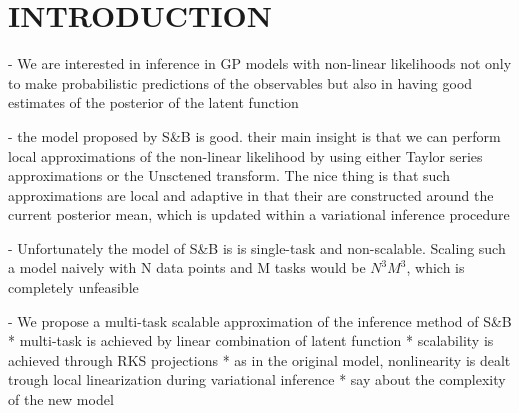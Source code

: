 \section{INTRODUCTION}
% 
\citet{steinberg-bonilla-nips-2014}


- We are interested in inference in GP models with non-linear likelihoods
not only to make probabilistic predictions of the observables but also in having
good estimates of the posterior of the latent function

- the model proposed by S\&B \citep{steinberg-bonilla-nips-2014}
  is good. their main insight is that we can perform 
local approximations of the non-linear likelihood by using either Taylor series 
approximations  or the Unsctened transform. The nice thing is that such approximations
are local and adaptive in that their are constructed around the current posterior 
mean, which is updated within a variational inference procedure 

- Unfortunately the model of S\&B is  is single-task and non-scalable. 
Scaling such a model naively with N data points and M tasks would be $N^3M^3$,
which is completely unfeasible

- We propose a multi-task scalable approximation of  the inference method of S\&B 
* multi-task is achieved by linear combination of latent function
* scalability is achieved through RKS  projections 
* as in the original model, nonlinearity is dealt trough local linearization during 
variational inference
* say about the complexity of the new model 





